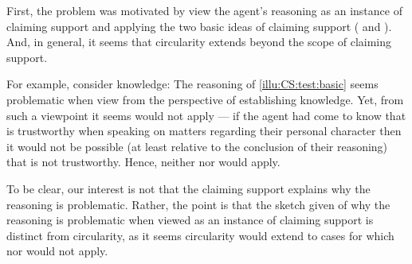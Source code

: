 \begin{note}
  First, the problem was motivated by view the agent's reasoning as an instance of claiming support and applying the two basic ideas of claiming support (\ideaS{} and \ideaCS{}).
  And, in general, it seems that circularity extends beyond the scope of claiming support.

  For example, consider knowledge:
  The reasoning of \autoref{illu:CS:test:basic} seems problematic when view from the perspective of establishing knowledge.
  Yet, from such a viewpoint it seems \ideaS{} would not apply --- if the agent had come to know that  is trustworthy when speaking on matters regarding their personal character then it would not be possible (at least relative to the conclusion of their reasoning) that  is not trustworthy.
  Hence, neither \ideaS{} nor \ideaCS{} would apply.

  To be clear, our interest is not that the claiming support explains why the reasoning is problematic.
  Rather, the point is that the sketch given of why the reasoning is problematic when viewed as an instance of claiming support is distinct from circularity, as it seems circularity would extend to cases for which \ideaS{} nor \ideaCS{} would not apply.
\end{note}

